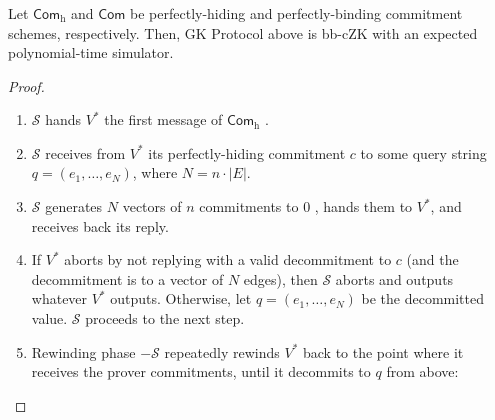 \documentclass{beamer}
\begin{document}
    \begin{frame}
        \frametitle{}
        \begin{theorem}
            Let $\mathsf{Com}_{\mathrm{h}}$ and $\mathsf{Com}$ be perfectly-hiding and perfectly-binding commitment schemes, respectively. Then, GK Protocol above is bb-cZK with an expected polynomial-time simulator.
        \end{theorem}
    
        \begin{proof}
            \begin{enumerate}
                \item $\mathcal{S}$ hands $V^{*}$ the first message of $\mathsf{Com}_{\mathrm{h}}$ .
                \item $\mathcal{S}$ receives from $V^{*}$ its perfectly-hiding commitment $c$ to some query string $q=\left(e_{1}, \ldots, e_{N}\right)$, where $N=n \cdot|E|$.
                \item $\mathcal{S}$ generates $N$ vectors of $n$ commitments to $0$ , hands them to $V^{*}$, and receives back its reply.
                \item If $V^{*}$ aborts by not replying with a valid decommitment to $c$ (and the decommitment is to a vector of $N$ edges), then $\mathcal{S}$ aborts and outputs whatever $V^{*}$ outputs. Otherwise, let $q=\left(e_{1}, \ldots, e_{N}\right)$ be the decommitted value. $\mathcal{S}$ proceeds to the next step.
                \item Rewinding phase $-\mathcal{S}$ repeatedly rewinds $V^{*}$ back to the point where it receives the prover commitments, until it decommits to $q$ from above:
            \end{enumerate}
        \end{proof}        
    
    \end{frame}
\end{document}
